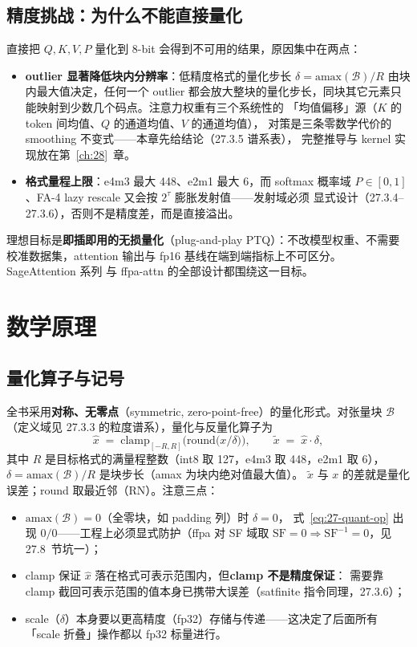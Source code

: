 \subsection{精度挑战：为什么不能直接量化}

直接把 $Q,K,V,P$ 量化到 8-bit 会得到不可用的结果，原因集中在两点：
\begin{itemize}[itemsep=2pt,topsep=2pt]
  \item \textbf{outlier 显著降低块内分辨率}：低精度格式的量化步长
        $\delta = \mathrm{amax}(\mathcal{B})/R$ 由块内最大值决定，任何一个 outlier
        都会放大整块的量化步长，同块其它元素只能映射到少数几个码点。注意力权重有三个系统性的
        「均值偏移」源（$K$ 的 token 间均值、$Q$ 的通道均值、$V$ 的通道均值），
        对策是三条零数学代价的 smoothing 不变式——本章先给结论（27.3.5 谱系表），
        完整推导与 kernel 实现放在第~\ref{ch:28}~章。
  \item \textbf{格式量程上限}：e4m3 最大 448、e2m1 最大 6，而 softmax 概率域
        $P \in [0,1]$、FA-4 lazy rescale 又会按 $2^{\tau}$ 膨胀发射值——发射域必须
        显式设计（27.3.4--27.3.6），否则不是精度差，而是直接溢出。
\end{itemize}
理想目标是\textbf{即插即用的无损量化}（plug-and-play PTQ）：不改模型权重、不需要
校准数据集，attention 输出与 fp16 基线在端到端指标上不可区分。SageAttention 系列
与 ffpa-attn 的全部设计都围绕这一目标。

\section{数学原理}

\subsection{量化算子与记号}

全书采用\textbf{对称、无零点}（symmetric, zero-point-free）的量化形式。对张量块
$\mathcal{B}$（定义域见 27.3.3 的粒度谱系），量化与反量化算子为
\begin{equation}
  \hat{x} \;=\; \mathrm{clamp}_{[-R,R]}\!\Big(\mathrm{round}\big(x / \delta\big)\Big),
  \qquad
  \tilde{x} \;=\; \hat{x} \cdot \delta,
  \label{eq:27-quant-op}
\end{equation}
其中 $R$ 是目标格式的满量程整数（int8 取 127，e4m3 取 448，e2m1 取 6），
$\delta = \mathrm{amax}(\mathcal{B}) / R$ 是块步长（amax 为块内绝对值最大值）。
$\tilde{x}$ 与 $x$ 的差就是量化误差；round 取最近邻（RN）。注意三点：
\begin{itemize}[itemsep=2pt,topsep=2pt]
  \item $\mathrm{amax}(\mathcal{B}) = 0$（全零块，如 padding 列）时 $\delta = 0$，
        式~\ref{eq:27-quant-op} 出现 $0/0$——工程上必须显式防护（ffpa 对 SF 域取
        $\mathrm{SF} = 0 \Rightarrow \mathrm{SF}^{-1} = 0$，见 27.8~节坑一）；
  \item clamp 保证 $\hat{x}$ 落在格式可表示范围内，但\textbf{clamp 不是精度保证}：
        需要靠 clamp 截回可表示范围的值本身已携带大误差（satfinite 指令同理，27.3.6）；
  \item scale（$\delta$）本身要以更高精度（fp32）存储与传递——这决定了后面所有
        「scale 折叠」操作都以 fp32 标量进行。
\end{itemize}

